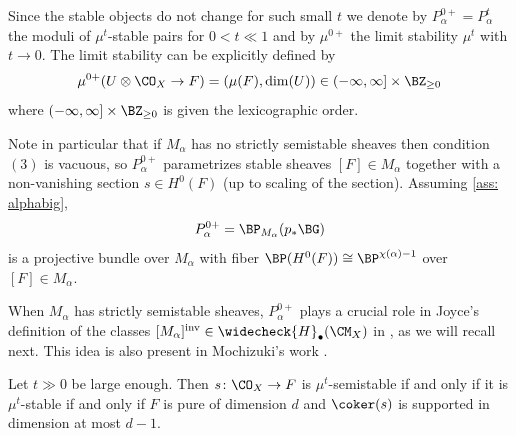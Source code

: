 Since the stable objects do not change for such small $t$ we denote by $P_\alpha^{0+}=P_\alpha^t$ the moduli of $\mu^t$-stable pairs for $0<t\ll 1$ and by $\mu^{0+}$ the limit stability $\mu^t$ with $t\rightarrow 0$. The limit stability can be explicitly defined by
\[\mu^{0+}(U\otimes \CO_X\to F)=(\mu(F), \dim(U))\in (-\infty, \infty]\times \BZ_{\geq 0}\]
where $(-\infty, \infty]\times \BZ_{\geq 0}$ is given the lexicographic order.

Note in particular that if $M_\alpha$ has no strictly semistable sheaves then condition $(3)$ is vacuous, so $P_\alpha^{0+}$ parametrizes stable sheaves $[F]\in M_\alpha$ together with a non-vanishing section $s\in H^0(F)$ (up to scaling of the section). Assuming \ref{ass: alphabig},
\[P_\alpha^{0+}=\BP_{M_\alpha}(p_\ast \BG)\]
 is a projective bundle over $M_\alpha$ with fiber $\BP(H^0(F))\cong \BP^{\chi(\alpha)-1}$ over $[F]\in M_\alpha$.

When $M_\alpha$ has strictly semistable sheaves, $P_\alpha^{0+}$ plays a crucial role in Joyce's definition of the classes $[M_\alpha]^{\mathrm{inv}}\in \widecheck{H}_\bullet(\CM_X)$ in \cite[Section $9.1$]{Jo21}, as we will recall next. This idea is also present in Mochizuki's work \cite{mochizuki}.

\begin{proposition}[{\cite[Lemma 1.3]{PT}}]
\notready
\label{prop: limittinfty}
Let $t\gg 0$ be large enough. Then $s\colon \CO_X\to F$ is $\mu^{t}$-semistable if and only if it is $\mu^t$-stable if and only if $F$ is pure of dimension $d$ and $\coker(s)$ is supported in dimension at most $d-1$.
\end{proposition}

